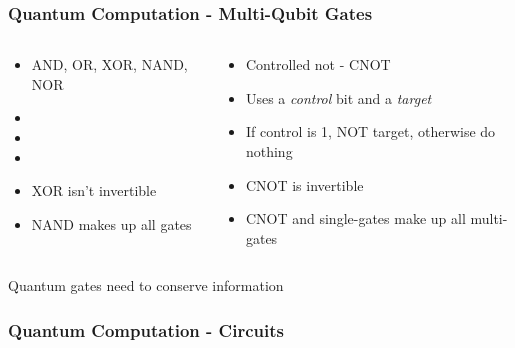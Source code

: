 \documentclass[aspectratio=169]{beamer}
\begin{document}
\begin{frame}
    \frametitle{Quantum Computation - Multi-Qubit Gates}
    \begin{columns}
        \begin{column}{0.5\textwidth}
            \begin{itemize}
                \item AND, OR, XOR, NAND, NOR
                \item[]
                \item[]
                \item[] 
                \item XOR isn't invertible
                \item NAND makes up all gates
            \end{itemize}
        \end{column}
        \begin{column}{0.5\textwidth}
            \begin{itemize}
                \item Controlled not - CNOT
                \item Uses a \emph{control} bit and a \emph{target}
                \item If control is 1, NOT target, otherwise do nothing
                \item CNOT is invertible
                \item CNOT and single-gates make up all multi-gates
            \end{itemize}
        \end{column}
    \end{columns}
    \begin{alertblock}{}
        \centering Quantum gates need to conserve information
    \end{alertblock}
\end{frame}

\begin{frame}
    \frametitle{Quantum Computation - Circuits}
    \begin{columns}
        \begin{column}{0.5\textwidth}
            
        \end{column}
        \begin{column}{0.5\textwidth}
            
        \end{column}
    \end{columns}
\end{frame}
\end{document}
